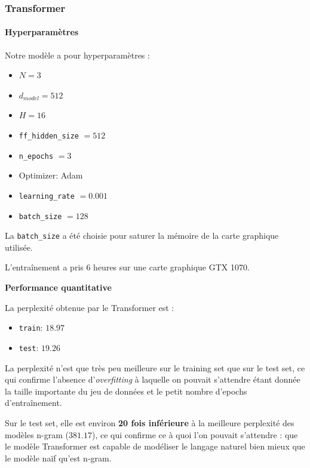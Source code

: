 \hypertarget{transformer}{%
\subsubsection{Transformer}\label{transformer}}

\paragraph{Hyperparamètres}

Notre modèle a pour hyperparamètres :

\begin{itemize}
\item
  \(N = 3\)
\item
  \(d_{model} = 512\)
\item
  \(H = 16\)
\item
  \texttt{ff\_hidden\_size} $ = 512$
\item
  \texttt{n\_epochs} $ = 3$
\item
  Optimizer: Adam
\item
  \texttt{learning\_rate} $ = 0.001 $
\item
  \texttt{batch\_size} $ = 128$
\end{itemize}

La \texttt{batch\_size} a été choisie pour saturer la mémoire de la
carte graphique utilisée.

L'entraînement a pris 6 heures sur une carte graphique GTX 1070.

\noindent{}\textbf{Performance quantitative}

La perplexité obtenue par le Transformer est :

\begin{itemize}
\item
  \texttt{train}: \(18.97\)
\item
  \texttt{test}: \(19.26\)
\end{itemize}

La perplexité n'est que très peu meilleure sur le training set que sur
le test set, ce qui confirme l'absence d'\textit{overfitting} à laquelle
on pouvait s'attendre étant donnée la taille importante du jeu de
données et le petit nombre d'epochs d'entraînement.

Sur le test set, elle est environ \textbf{20 fois inférieure} à la
meilleure perplexité des modèles n-gram (\(381.17\)), ce qui confirme ce
à quoi l'on pouvait s'attendre : que le modèle Transformer est capable
de modéliser le langage naturel bien mieux que le modèle naïf qu'est
n-gram. \\

